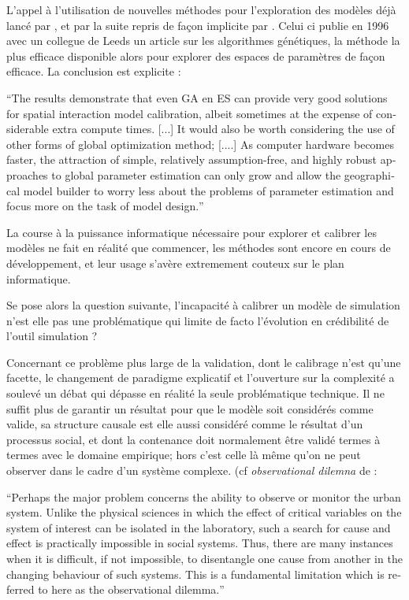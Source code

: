 L'appel à l'utilisation de nouvelles méthodes pour l'exploration des modèles déjà lancé par \textcite{Batty1976}, et par la suite repris de façon implicite par \textcite{Openshaw1996}. Celui ci publie en 1996 avec un collegue de Leeds un article sur les algorithmes génétiques, la méthode la plus efficace disponible alors pour explorer des espaces de paramètres de façon efficace. La conclusion est explicite :

\foreignquote{english}{The results demonstrate that even GA en ES can provide very good solutions for spatial interaction model calibration, albeit sometimes at the expense of considerable extra compute times. [...] It would also be worth considering the use of other forms of global optimization method; [....] As computer hardware becomes faster, the attraction of simple, relatively assumption-free, and highly robust approaches to global parameter estimation can only grow and allow the geographical model builder to worry less about the problems of parameter estimation and focus more on the task of model design.}\autocite{Openshaw1996}

La course à la puissance informatique nécessaire pour explorer et calibrer les modèles ne fait en réalité que commencer, les méthodes sont encore en cours de développement, et leur usage s'avère extremement couteux sur le plan informatique.

Se pose alors la question suivante, l'incapacité à calibrer un modèle de simulation n'est elle pas une problématique qui limite de facto l'évolution en crédibilité de l'outil simulation ? 

Concernant ce problème plus large de la validation, dont le calibrage n'est qu'une facette, le changement de paradigme explicatif et l'ouverture sur la complexité a soulevé un débat qui dépasse en réalité la seule problématique technique. Il ne suffit plus de garantir un résultat pour que le modèle soit considérés comme valide, sa structure causale est elle aussi considéré comme le résultat d'un processus social, et dont la contenance doit normalement être validé termes à termes avec le domaine empirique; hors c'est celle là même qu'on ne peut observer dans le cadre d'un système complexe. (cf \textit{observational dilemna} de \textcite[296]{Batty1976} :

\foreignquote{english}{Perhaps the major problem concerns the ability to observe or monitor the urban system. Unlike the physical sciences in which the effect of critical variables on the system of interest can be isolated in the laboratory, such a search for cause and effect is practically impossible in social systems. Thus, there are many instances when it is difficult, if not impossible, to disentangle one cause from another in the changing behaviour of such systems. This is a fundamental limitation which is referred to here as the observational dilemma.}

